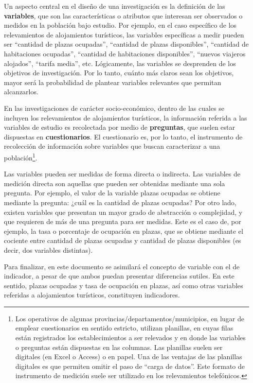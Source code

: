 \documentclass[
]{book}
\begin{document}
Un aspecto central en el diseño de una investigación es la definición de las \textbf{variables}, que son las características o atributos que interesan ser observados o medidos en la población bajo estudio. Por ejemplo, en el caso específico de los relevamientos de alojamientos turísticos, las variables específicas a medir pueden ser ``cantidad de plazas ocupadas'', ``cantidad de plazas disponibles'', ``cantidad de habitaciones ocupadas'', ``cantidad de habitaciones disponibles'', ``nuevos viajeros alojados'', ``tarifa media'', etc. Lógicamente, las variables se desprenden de los objetivos de investigación. Por lo tanto, cuánto más claros sean los objetivos, mayor será la probabilidad de plantear variables relevantes que permitan alcanzarlos.

En las investigaciones de carácter socio-económico, dentro de las cuales se incluyen los relevamientos de alojamientos turísticos, la información referida a las variables de estudio es recolectada por medio de \textbf{preguntas}, que suelen estar dispuestas en \textbf{cuestionarios}. El cuestionario es, por lo tanto, el instrumento de recolección de información sobre variables que buscan caracterizar a una población\footnote{Los operativos de algunas provincias/departamentos/municipios, en lugar de emplear cuestionarios en sentido estricto, utilizan planillas, en cuyas filas están registrados los establecimientos a ser relevados y en donde las variables o preguntas están dispuestas en las columnas. Las planillas suelen ser digitales (en Excel o Access) o en papel. Una de las ventajas de las planillas digitales es que permiten omitir el paso de ``carga de datos''. Este formato de instrumento de medición suele ser utilizado en los relevamientos telefónicos.}.

Las variables pueden ser medidas de forma directa o indirecta. Las variables de medición directa son aquellas que pueden ser obtenidas mediante una sola pregunta. Por ejemplo, el valor de la variable plazas ocupadas se obtiene mediante la pregunta: ¿cuál es la cantidad de plazas ocupadas? Por otro lado, existen variables que presentan un mayor grado de abstracción o complejidad, y que requieren de más de una pregunta para ser medidas. Este es el caso de, por ejemplo, la tasa o porcentaje de ocupación en plazas, que se obtiene mediante el cociente entre cantidad de plazas ocupadas y cantidad de plazas disponibles (es decir, dos variables distintas).

Para finalizar, en este documento se asimilará el concepto de variable con el de indicador, a pesar de que ambos puedan presentar diferencias sutiles. En este sentido, plazas ocupadas y tasa de ocupación en plazas, así como otras variables referidas a alojamientos turísticos, constituyen indicadores.
\end{document}
